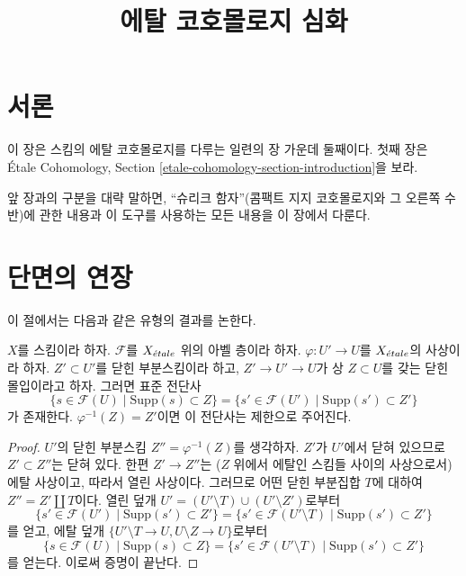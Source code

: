 

%


\title{에탈 코호몰로지 심화}


\maketitle

\label{section-phantom}

\tableofcontents


\section{서론}
\label{section-introduction}

\noindent
이 장은 스킴의 에탈 코호몰로지를 다루는 일련의 장 가운데 둘째이다.
첫째 장은 \'Etale Cohomology, Section
\ref{etale-cohomology-section-introduction}을 보라.

\medskip\noindent
앞 장과의 구분을 대략 말하면, ``슈리크 함자''(콤팩트 지지 코호몰로지와
그 오른쪽 수반)에 관한 내용과 이 도구를 사용하는 모든 내용을 이 장에서
다룬다.






\section{단면의 연장}
\label{section-growing}

\noindent
이 절에서는 다음과 같은 유형의 결과를 논한다.

\begin{lemma}
\label{lemma-section-support-in-locally-closed-pre}
$X$를 스킴이라 하자. $\mathcal{F}$를 $X_{\acute{e}tale}$ 위의 아벨 층이라 하자.
$\varphi : U' \to U$를 $X_{\acute{e}tale}$의 사상이라 하자. $Z' \subset U'$를
닫힌 부분스킴이라 하고, $Z' \to U' \to U$가 상 $Z \subset U$를 갖는
닫힌 몰입이라고 하자. 그러면 표준 전단사
$$
\{s \in \mathcal{F}(U) \mid \text{Supp}(s) \subset Z\} =
\{s' \in \mathcal{F}(U') \mid \text{Supp}(s') \subset Z'\}
$$
가 존재한다. $\varphi^{-1}(Z) = Z'$이면 이 전단사는 제한으로 주어진다.
\end{lemma}

\begin{proof}
$U'$의 닫힌 부분스킴 $Z'' = \varphi^{-1}(Z)$를 생각하자.
$Z'$가 $U'$에서 닫혀 있으므로 $Z' \subset Z''$는 닫혀 있다.
한편 $Z' \to Z''$는 ($Z$ 위에서 에탈인 스킴들 사이의 사상으로서)
에탈 사상이고, 따라서 열린 사상이다. 그러므로 어떤 닫힌 부분집합 $T$에
대하여 $Z'' = Z' \amalg T$이다. 열린 덮개
$U' = (U' \setminus T) \cup (U' \setminus Z')$로부터
$$
\{s' \in \mathcal{F}(U') \mid \text{Supp}(s') \subset Z'\} =
\{s' \in \mathcal{F}(U' \setminus T) \mid \text{Supp}(s') \subset Z'\}
$$
를 얻고, 에탈 덮개
$\{U' \setminus T \to U, U \setminus Z \to U\}$로부터
$$
\{s \in \mathcal{F}(U) \mid \text{Supp}(s) \subset Z\} =
\{s' \in \mathcal{F}(U' \setminus T) \mid \text{Supp}(s') \subset Z'\}
$$
를 얻는다. 이로써 증명이 끝난다.
\end{proof}

